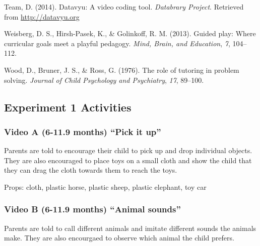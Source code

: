 \documentclass[man,floatsintext]{apa6}
\begin{document}
\leavevmode\hypertarget{ref-datavyu}{}%
Team, D. (2014). Datavyu: A video coding tool. \emph{Databrary Project}. Retrieved from \url{http://datavyu.org}

\leavevmode\hypertarget{ref-Weisberg2013}{}%
Weisberg, D. S., Hirsh-Pasek, K., \& Golinkoff, R. M. (2013). Guided play: Where curricular goals meet a playful pedagogy. \emph{Mind, Brain, and Education}, \emph{7}, 104--112.

\leavevmode\hypertarget{ref-Wood1976}{}%
Wood, D., Bruner, J. S., \& Ross, G. (1976). The role of tutoring in problem solving. \emph{Journal of Child Psychology and Psychiatry}, \emph{17}, 89--100.

\endgroup

\clearpage
\makeatletter
\efloat@restorefloats
\makeatother


\begin{appendix}
\section{}
\hypertarget{experiment-1-activities}{%
\subsection{Experiment 1 Activities}\label{experiment-1-activities}}

\hypertarget{video-a-6-11.9-months-pick-it-up}{%
\subsubsection{Video A (6-11.9 months) ``Pick it
up''}\label{video-a-6-11.9-months-pick-it-up}}

Parents are told to encourage their child to pick up and drop individual
objects. They are also encouraged to place toys on a small cloth and
show the child that they can drag the cloth towards them to reach the
toys.

Props: cloth, plastic horse, plastic sheep, plastic elephant, toy car

\hypertarget{video-b-6-11.9-months-animal-sounds}{%
\subsubsection{Video B (6-11.9 months) ``Animal
sounds''}\label{video-b-6-11.9-months-animal-sounds}}

Parents are told to call different animals and imitate different sounds
the animals make. They are also encourgaed to observe which animal the
child prefers.


\end{appendix}
\end{document}
